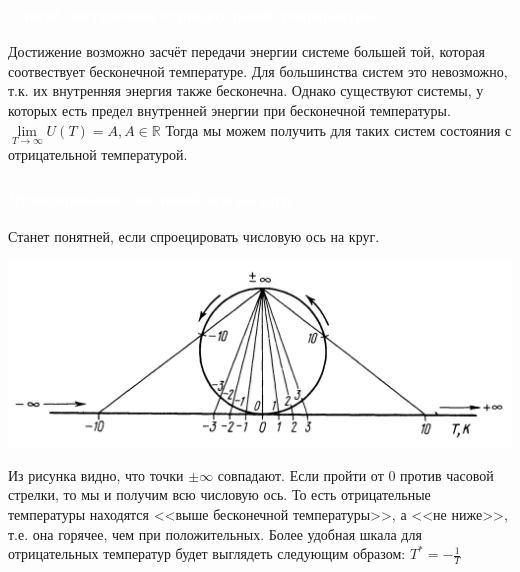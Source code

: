 \documentclass[aspectratio=169]{beamer}
\begin{document}
\begin{frame}
\frametitle{\textcolor{white}{Способ достижения отрицательной температуры}} 
Достижение возможно засчёт передачи энергии системе большей той, которая соотвествует бесконечной температуре. Для большинства систем это невозможно, т.к. их внутренняя энергия также бесконечна.
Однако существуют системы, у которых есть предел внутренней энергии при бесконечной температуры. 
$\lim\limits_{T\to \infty} U(T) = A, A \in \mathbb{R}$
\newline
\newline
Тогда мы можем получить для таких систем состояния с отрицательной температурой.

\end{frame}


\begin{frame}
\frametitle{\textcolor{white}{Проецирование числовой оси на круг}} 
Станет понятней, если спроецировать числовую ось на круг.

\begin{flushright}
\begin{minipage}{.65\textwidth}
  \includegraphics[scale=0.2]{circle}
\end{minipage}

\end{flushright}
Из рисунка видно, что точки $\pm \infty $ совпадают. Если пройти от 0 против часовой стрелки, то мы и получим всю числовую ось. То есть отрицательные температуры находятся <<выше бесконечной температуры>>, а <<не ниже>>, т.е. она горячее, чем при положительных. Более удобная шкала для отрицательных температур будет выглядеть следующим образом: $T^{\ast} = -\frac{1}{T}$
\end{frame}
\end{document}
